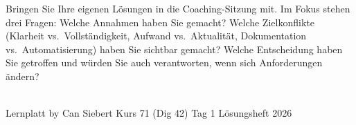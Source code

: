 \documentclass[11pt,a4paper,oneside]{article}
\begin{document}
\medskip
\begin{infobox}
Bringen Sie Ihre eigenen L\"osungen in die Coaching-Sitzung mit. Im Fokus stehen drei Fragen: Welche Annahmen haben Sie gemacht? Welche Zielkonflikte (Klarheit vs.\ Vollst\"andigkeit, Aufwand vs.\ Aktualit\"at, Dokumentation vs.\ Automatisierung) haben Sie sichtbar gemacht? Welche Entscheidung haben Sie getroffen \textendash{} und w\"urden Sie auch verantworten, wenn sich Anforderungen \"andern?
\end{infobox}

\vspace{1cm}
\noindent{\color{lpAccent}\rule{\linewidth}{0.6pt}}\\[4pt]
{\footnotesize\sffamily\color{lpGray}Lernplatt \textperiodcentered{} by Can Siebert \textperiodcentered{} Kurs 71 (Dig 42) \textperiodcentered{} Tag 1 \textperiodcentered{} L\"osungsheft \textperiodcentered{} \textcopyright{} 2026}
\end{document}
